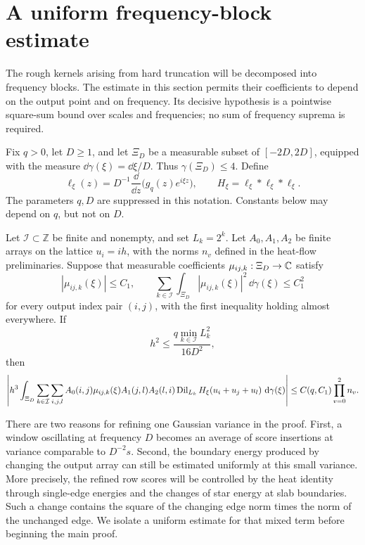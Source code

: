 \section{A uniform frequency-block estimate}\label{sec:frequency}

The rough kernels arising from hard truncation will be decomposed into
frequency blocks.  The estimate in this section permits their coefficients
to depend on the output point and on frequency.  Its decisive hypothesis is
a pointwise square-sum bound over scales and frequencies; no sum of
frequency suprema is required.

Fix $q>0$, let $D\geq1$, and let $\Xi_D$ be a measurable subset of
$[-2D,2D]$, equipped with the measure $\dd\gamma(\xi)=\dd\xi/D$.
Thus $\gamma(\Xi_D)\leq4$.  Define
\begin{equation}\label{eq:frequency-windows}
 \ell_\xi(z)=D^{-1}\frac{\dd}{\dd z}
                 \bigl(g_q(z)e^{i\xi z}\bigr),
 \qquad H_\xi=\ell_\xi*\ell_\xi*\ell_\xi.
\end{equation}
The parameters $q,D$ are suppressed in this notation.  Constants below
may depend on $q$, but not on $D$.

\begin{proposition}\label{prop:frequency-block}
Let $\mathcal I\subset\mathbb Z$ be finite and nonempty, and set
$L_k=2^k$.  Let $A_0,A_1,A_2$ be finite arrays on the lattice
$u_i=ih$, with the norms $n_v$ defined in the heat-flow preliminaries.
Suppose that measurable coefficients $\mu_{ij,k}:\Xi_D\to\mathbb C$ satisfy
\begin{equation}\label{eq:frequency-coefficient-condition}
 |\mu_{ij,k}(\xi)|\leq C_1,
 \qquad
 \sum_{k\in\mathcal I}\int_{\Xi_D}
           |\mu_{ij,k}(\xi)|^2\,\dd\gamma(\xi)\leq C_1^2
\end{equation}
for every output index pair $(i,j)$, with the first inequality holding
almost everywhere.  If
\begin{equation}\label{eq:frequency-mesh}
 h^2\leq\frac{q\min_{k\in\mathcal I}L_k^2}{16D^2},
\end{equation}
then
\begin{equation}\label{eq:frequency-finite-estimate}
 \left|h^3\int_{\Xi_D}\sum_{k\in\mathcal I}\sum_{i,j,l}
 A_0(i,j)\mu_{ij,k}(\xi)A_1(j,l)A_2(l,i)
 \operatorname{Dil}_{L_k}H_\xi(u_i+u_j+u_l)\,\,\mathrm d\gamma(\xi)\right|
 \leq C(q,C_1)\prod_{v=0}^2n_v.
\end{equation}
\end{proposition}

There are two reasons for refining one Gaussian variance in the proof.
First, a window oscillating at frequency $D$ becomes an average of score
insertions at variance comparable to $D^{-2}s$.  Second, the boundary
energy produced by changing the output array can still be estimated
uniformly at this small variance.  More precisely, the refined row
scores will be controlled by the heat identity through single-edge
energies and the changes of star energy at slab boundaries.  Such a
change contains the square of the changing edge norm times the norm
of the unchanged edge.  We isolate a uniform estimate for that mixed
term before beginning the main proof.

